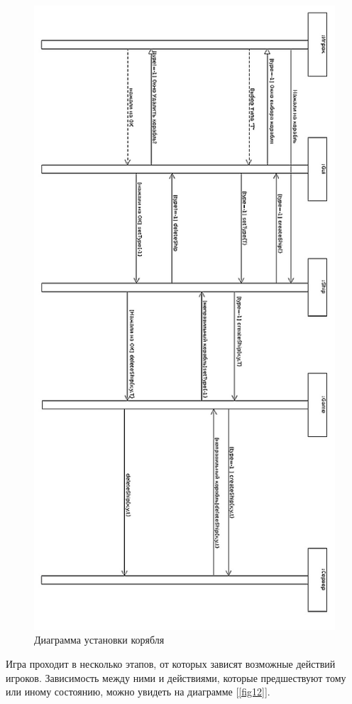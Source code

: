 \begin{figure}[pt]
\centering
\includegraphics[width=12cm]{images/CRS.png}
\caption{Диаграмма установки корябля}
\label{fig11}
\end{figure}

Игра проходит в несколько этапов, от которых зависят возможные действий игроков. Зависимость между ними и действиями, которые предшествуют тому или иному состоянию, можно увидеть на диаграмме [\ref{fig12}].

